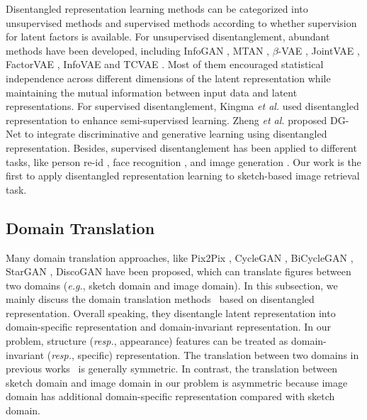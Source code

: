 \documentclass[10pt,twocolumn,letterpaper]{article}
\begin{document}
Disentangled representation learning methods can be categorized into unsupervised methods and supervised methods according to whether supervision for latent factors is available.
For unsupervised disentanglement, abundant methods have been developed, including InfoGAN \cite{chen2016infogan}, MTAN \cite{liu2018multi}, $\beta$-VAE \cite{higgins2017beta}, JointVAE \cite{dupont2018learning}, FactorVAE \cite{kim2018disentangling}, InfoVAE \cite{zhao2017infovae} and TCVAE \cite{chen2018isolating}. 
Most of them encouraged statistical independence across different dimensions of the latent representation while maintaining the mutual information between input data and latent representations.
For supervised disentanglement, Kingma \textit{et al.}  \cite{kingma2014semi} used disentangled representation to enhance semi-supervised learning. Zheng \textit{et al.} \cite{zheng2019joint} proposed DG-Net to integrate discriminative and generative learning using disentangled representation. Besides, supervised disentanglement has been applied to different tasks, like person re-id \cite{zheng2019joint}, face recognition \cite{liu2018unified, liu2018exploring, shu2017neural, tran2017disentangled}, and image generation \cite{ma2018disentangled, yan2016attribute2image, mathieu2016disentangling, jha2018disentangling}. Our work is the first to apply disentangled representation learning to sketch-based image retrieval task. 

\subsection{Domain Translation}
Many domain translation approaches, like Pix2Pix \cite{pix2pix2017}, CycleGAN \cite{zhu2017unpaired}, BiCycleGAN \cite{zhu2017toward}, StarGAN \cite{StarGAN2018}, DiscoGAN \cite{kim2017learning} have been proposed, which can translate figures between two domains (\emph{e.g.}, sketch domain and image domain).
In this subsection, we mainly discuss the domain translation methods~\cite{lee2018diverse,lee2019drit,huang2018multimodal,gonzalez2018image} based on disentangled representation. 
Overall speaking, they disentangle latent representation into domain-specific representation and domain-invariant representation. In our problem, structure (\emph{resp.}, appearance) features can be treated as domain-invariant (\emph{resp.}, specific) representation. The translation between two domains in previous works~\cite{lee2018diverse,lee2019drit,huang2018multimodal,gonzalez2018image} is generally symmetric. In contrast, the translation between sketch domain and image domain in our problem is asymmetric because image domain has additional domain-specific representation compared with sketch domain.
\end{document}
